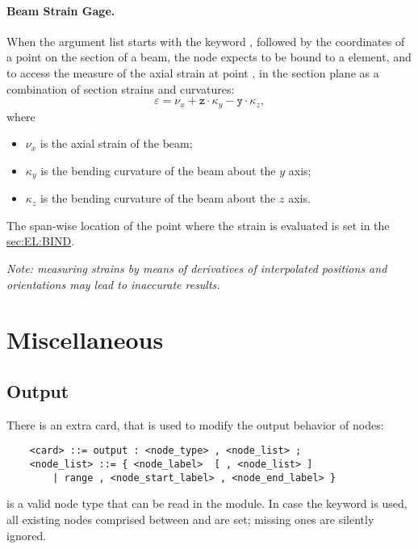 \paragraph{Beam Strain Gage.}
\label{sec:NODE:PARAMETER:BEAM_STRAIN_GAGE}
When the argument list starts with the keyword ,
followed by the coordinates of a point on the section of a beam,
the  node expects to be bound to a  element,
and to access the measure of the axial strain at point , 
in the section plane as a combination of section strains and curvatures:
\begin{equation}
	\varepsilon = \nu_x
		+ \mathtt{z} \cdot \kappa_y 
		- \mathtt{y} \cdot \kappa_z ,
\end{equation}
where
\begin{itemize}
\item $\nu_x$ is the axial strain of the beam;
\item $\kappa_y$ is the bending curvature of the beam about the $y$ axis;
\item $\kappa_z$ is the bending curvature of the beam about the $z$ axis.
\end{itemize}
The span-wise location of the point where the strain is evaluated
is set in the 
\hyperref{\kwnd{bind} statement}{\kw{bind} statement (see Section~}{)}{sec:EL:BIND}.

\emph{Note: measuring strains by means of derivatives of interpolated
positions and orientations may lead to inaccurate results.}





\section{Miscellaneous}

\subsection{Output}
\label{sec:NODE:MISC:OUTPUT}
There is an extra card, that is used to modify the output behavior of nodes:  
\begin{verbatim}
    <card> ::= output : <node_type> , <node_list> ;
    <node_list> ::= { <node_label>  [ , <node_list> ] 
        | range , <node_start_label> , <node_end_label> }
\end{verbatim}
 is a valid node type that can be read in the 
module.
In case the keyword  is used, all existing nodes comprised
between  and 
are set; missing ones are silently ignored.

